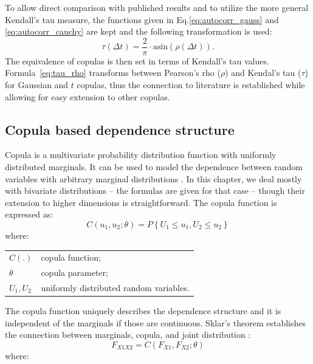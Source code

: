 To allow direct comparison with published results and to utilize the more general Kendall's tau measure, the functions given in Eq.\ref{eq:autocorr_gauss} and \ref{eq:autocorr_cauchy} are kept and the following transformation is used:
\begin{equation}
\label{eq:tau_rho}
	\tau (\Delta t) = \frac{2}{\pi } \cdot \mathrm{asin}\left( {\rho (\Delta t)} \right).
\end{equation}
The equivalence of copulas is then set in terms of Kendall's tau values. Formula~\ref{eq:tau_rho} transforms between Pearson's rho ($\rho$) and Kendal's tau ($\tau$) for Gaussian and $t$ copulas, thus the connection to literature is established while allowing for easy extension to other copulas.

\subsection{Copula based dependence structure}
\label{sec:copula}

Copula is a multivariate probability distribution function with uniformly distributed marginals. It can be used to model the dependence between random variables with arbitrary marginal distributions \citep{Joe2014}. In this chapter, we deal mostly with bivariate distributions -- the formulas are given for that case -- though their extension to higher dimensions is straightforward. The copula function is expressed as:
\begin{equation}
\label{eq:copula_cdf}
	C\left( {{u_1},{u_2};\theta } \right) = {P}\left\{ {{U_1} \le {u_1},{U_2} \le {u_2}} \right\}
\end{equation}
where:

\begin{tabular}{ll}
	$C(.)$ & copula function; \\
	$\theta$ & copula parameter; \\
	$U_1, U_2$ & uniformly distributed random variables.
\end{tabular} \medskip  

\noindent
The copula function uniquely describes the dependence structure and it is independent of the marginals if those are continuous. Sklar's theorem establishes the connection between marginals, copula, and joint distribution \citep{Nelson2006, Marshall1996}:
\begin{equation}
\label{eq:sklar}
	{F_{X1X2}} = C\left( {{F_{X1}},{F_{X2}};\theta } \right)
\end{equation}
where:

